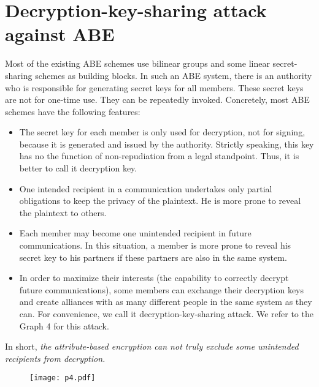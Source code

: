 \documentclass[11pt]{article}
\begin{document}
\section{Decryption-key-sharing attack against ABE}

Most of the existing ABE schemes use bilinear groups and  some linear secret-sharing schemes as building blocks. In such an ABE system, there is an authority who is responsible for generating secret keys for all members. These secret keys are not for one-time use. They can be repeatedly invoked. Concretely, most ABE schemes have the following features:

\begin{itemize}
\item{} The secret key for each member is only used for decryption, not for signing,  because it is generated and issued by the authority. Strictly speaking,  this key has no the function of non-repudiation from a legal standpoint. Thus, it is better to call it decryption key.

\item{} One intended recipient in a communication undertakes only partial obligations to keep the privacy of the plaintext. He is more prone to reveal the plaintext to others.

\item{} Each member may become one unintended recipient in future communications. In this situation, a member is more prone to reveal his secret key to his partners if these partners are also in the same system.

\item{} In order to maximize their interests (the capability to correctly decrypt future communications),
some members can exchange their decryption keys and create alliances with as many different people in the same system as they can. For convenience, we call it decryption-key-sharing attack. We refer to the Graph 4 for this attack.
\end{itemize}

In short, \emph{the attribute-based encryption can not truly exclude some unintended recipients from decryption.}

\begin{figure}[htbp]
\begin{minipage}[t]{.9\textwidth}
\hspace*{20mm} \texttt{[image: p4.pdf]}
\end{minipage}
\end{figure}
\end{document}
